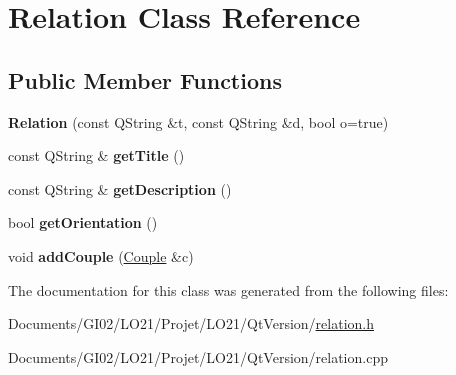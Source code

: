 \hypertarget{class_relation}{}\section{Relation Class Reference}
\label{class_relation}
\subsection*{Public Member Functions}
\begin{DoxyCompactItemize}
\item 
\mbox{\label{class_relation_ac80a2dddfc48008d40d5c0f5912c91fb}} 
{\bfseries Relation} (const Q\+String \&t, const Q\+String \&d, bool o=true)
\item 
\mbox{\label{class_relation_a8f8e09eebfd18260cf861666bbc158d5}} 
const Q\+String \& {\bfseries get\+Title} ()
\item 
\mbox{\label{class_relation_ab7e57505e988b1edfde861f1b5d932b2}} 
const Q\+String \& {\bfseries get\+Description} ()
\item 
\mbox{\label{class_relation_a6dc8d1bb7a79f02b37e338146bc4048f}} 
bool {\bfseries get\+Orientation} ()
\item 
\mbox{\label{class_relation_a6a42a4c0195c6dd8b3c9091a968b2396}} 
void {\bfseries add\+Couple} (\hyperlink{class_couple}{Couple} \&c)
\end{DoxyCompactItemize}


The documentation for this class was generated from the following files\+:\begin{DoxyCompactItemize}
\item 
Documents/\+G\+I02/\+L\+O21/\+Projet/\+L\+O21/\+Qt\+Version/\hyperlink{relation_8h}{relation.\+h}\item 
Documents/\+G\+I02/\+L\+O21/\+Projet/\+L\+O21/\+Qt\+Version/relation.\+cpp\end{DoxyCompactItemize}
